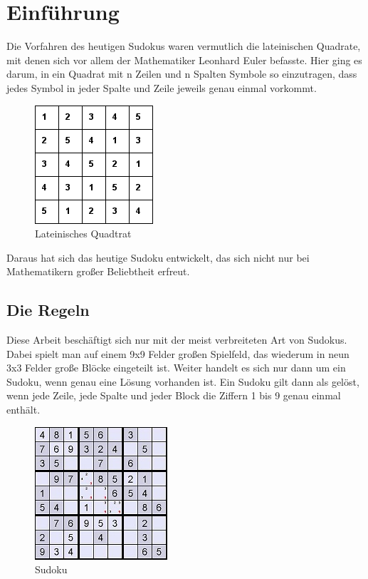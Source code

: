 \documentclass[accentcolor=tud6b,11pt,paper=a4]{tudreport}
\begin{document}

\chapter{Einführung}
Die Vorfahren des heutigen Sudokus waren vermutlich die lateinischen Quadrate, mit denen sich vor allem der Mathematiker Leonhard Euler befasste. Hier ging es darum, in ein Quadrat mit n Zeilen und n Spalten Symbole so einzutragen, dass jedes Symbol in jeder Spalte und Zeile jeweils genau einmal vorkommt.

\begin{figure}[htbp]
\begin{center}
\includegraphics{./img/lat_quadrat.png}
\caption{Lateinisches Quadtrat}
\end{center}
\end{figure}

Daraus hat sich das heutige Sudoku entwickelt, das sich nicht nur bei Mathematikern großer Beliebtheit erfreut.

\section{Die Regeln}
Diese Arbeit beschäftigt sich nur mit der meist verbreiteten Art von Sudokus. Dabei spielt man auf einem 9x9 Felder großen Spielfeld, das wiederum in neun 3x3 Felder große Blöcke eingeteilt ist. Weiter handelt es sich nur dann um ein Sudoku, wenn genau eine Lösung vorhanden ist.
Ein Sudoku gilt dann als gelöst, wenn jede Zeile, jede Spalte und jeder Block die Ziffern 1 bis 9 genau einmal enthält.\\
\begin{figure}[h]
\begin{center}
\includegraphics{./img/sudoku.jpg}
\caption{Sudoku}
\end{center}
\end{figure}
\end{document}
